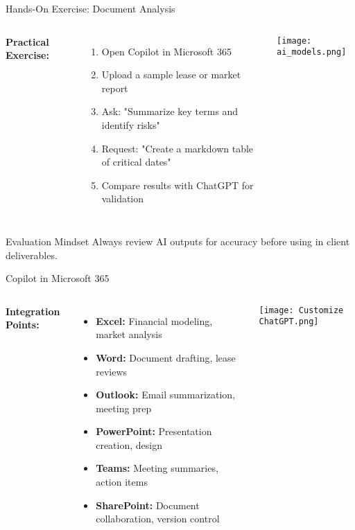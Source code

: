 \documentclass{beamer}
\begin{document}
\begin{frame}{Hands-On Exercise: Document Analysis}
  \begin{columns}
      \textbf{Practical Exercise:}
      \begin{enumerate}
        \item Open Copilot in Microsoft 365
        \item Upload a sample lease or market report
        \item Ask: "Summarize key terms and identify risks"
        \item Request: "Create a markdown table of critical dates"
        \item Compare results with ChatGPT for validation
      \end{enumerate}
      \centering
      \texttt{[image: ai\_models.png]}
  \end{columns}

  \begin{block}{Evaluation Mindset}
    Always review AI outputs for accuracy before using in client deliverables.
  \end{block}
\end{frame}


\begin{frame}{Copilot in Microsoft 365}
  \begin{columns}
      \textbf{Integration Points:}
      \begin{itemize}
        \item \textbf{Excel:} Financial modeling, market analysis
        \item \textbf{Word:} Document drafting, lease reviews
        \item \textbf{Outlook:} Email summarization, meeting prep
        \item \textbf{PowerPoint:} Presentation creation, design
        \item \textbf{Teams:} Meeting summaries, action items
        \item \textbf{SharePoint:} Document collaboration, version control
      \end{itemize}
      \centering
      \texttt{[image: Customize ChatGPT.png]}
  \end{columns}
\end{frame}
\end{document}
